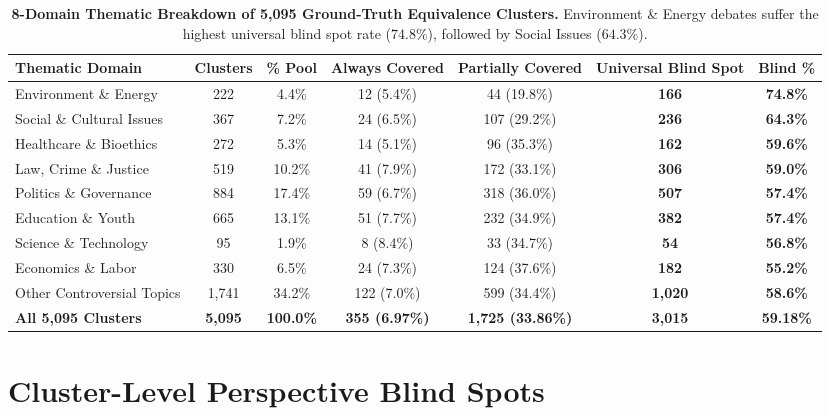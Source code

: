 \documentclass[11pt,a4paper]{article}
\begin{document}
\begin{table}[t]
\centering
\small
\begin{tabular}{lcccccc}
\toprule
\textbf{Thematic Domain} & \textbf{Clusters} & \textbf{\% Pool} & \textbf{Always Covered} & \textbf{Partially Covered} & \textbf{Universal Blind Spot} & \textbf{Blind \%} \\
\midrule
Environment \& Energy & 222 & 4.4\% & 12 (5.4\%) & 44 (19.8\%) & \textbf{166} & \textbf{74.8\%} \\
Social \& Cultural Issues & 367 & 7.2\% & 24 (6.5\%) & 107 (29.2\%) & \textbf{236} & \textbf{64.3\%} \\
Healthcare \& Bioethics & 272 & 5.3\% & 14 (5.1\%) & 96 (35.3\%) & \textbf{162} & \textbf{59.6\%} \\
Law, Crime \& Justice & 519 & 10.2\% & 41 (7.9\%) & 172 (33.1\%) & \textbf{306} & \textbf{59.0\%} \\
Politics \& Governance & 884 & 17.4\% & 59 (6.7\%) & 318 (36.0\%) & \textbf{507} & \textbf{57.4\%} \\
Education \& Youth & 665 & 13.1\% & 51 (7.7\%) & 232 (34.9\%) & \textbf{382} & \textbf{57.4\%} \\
Science \& Technology & 95 & 1.9\% & 8 (8.4\%) & 33 (34.7\%) & \textbf{54} & \textbf{56.8\%} \\
Economics \& Labor & 330 & 6.5\% & 24 (7.3\%) & 124 (37.6\%) & \textbf{182} & \textbf{55.2\%} \\
Other Controversial Topics & 1,741 & 34.2\% & 122 (7.0\%) & 599 (34.4\%) & \textbf{1,020} & \textbf{58.6\%} \\
\midrule
\textbf{All 5,095 Clusters} & \textbf{5,095} & \textbf{100.0\%} & \textbf{355 (6.97\%)} & \textbf{1,725 (33.86\%)} & \textbf{3,015} & \textbf{59.18\%} \\
\bottomrule
\end{tabular}
\caption{\textbf{8-Domain Thematic Breakdown of 5,095 Ground-Truth Equivalence Clusters.} Environment \& Energy debates suffer the highest universal blind spot rate ($74.8\%$), followed by Social Issues ($64.3\%$).}
\label{tab:cluster_blind_spots}
\end{table}

\section{Cluster-Level Perspective Blind Spots}
\end{document}

